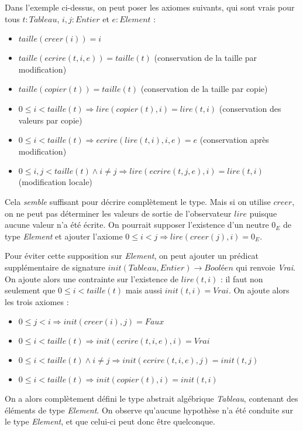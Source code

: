 \documentclass[../../../main.tex]{subfiles}
\begin{document}
Dans l'exemple ci-dessus, on peut poser les axiomes suivants, qui sont vrais pour tous $t:\textit{Tableau}$, $i, j:\textit{Entier}$ et $e:\textit{Element}$ : 
\begin{itemize}
	\item $taille(creer(i)) = i$
	\item $taille(ecrire(t, i, e)) = taille(t)$ (conservation de la taille par modification)

	\item $taille(copier(t)) = taille(t)$ (conservation de la taille par copie)
	\item $0\leq i < taille(t) \Rightarrow lire(copier(t), i) = lire(t, i)$ (conservation des valeurs par copie)
	
	\item $0\leq i < taille(t) \Rightarrow ecrire(lire(t, i), i, e) = e$ (conservation après modification)
	\item $0\leq i, j < taille(t) \wedge i \neq j \Rightarrow lire(ecrire(t, j, e), i) = lire(t, i)$ (modification locale)
\end{itemize}
Cela \textit{semble} suffisant pour décrire complètement le type. Mais si on utilise $creer$, on ne peut pas déterminer les valeurs de sortie de l'observateur $lire$ puisque aucune valeur n'a été écrite. On pourrait supposer l'existence d'un neutre $0_E$ de type \textit{Element} et ajouter l'axiome $0\leq i < j \Rightarrow lire(creer(j), i) = 0_E$.

Pour éviter cette supposition sur \textit{Element}, on peut ajouter un prédicat supplémentaire de signature $init(Tableau, Entier) \rightarrow \textit{Booléen}$ qui renvoie \textit{Vrai}. On ajoute alors une contrainte sur l'existence de $lire(t, i)$ : il faut non seulement que $0\leq i < taille(t)$ mais aussi $init(t, i) = Vrai$. On ajoute alors les trois axiomes :
\begin{itemize}
	\item $0\leq j < i \Rightarrow init(creer(i), j) = Faux$
	\item $0\leq i < taille(t) \Rightarrow init(ecrire(t, i, e), i) = Vrai$
	\item $0\leq i < taille(t) \wedge i\neq j \Rightarrow init(ecrire(t, i, e), j) = init(t, j)$
	\item $0\leq i < taille(t) \Rightarrow init(copier(t), i) = init(t, i)$
\end{itemize}
On a alors complètement défini le type abstrait algébrique \textit{Tableau}, contenant des éléments de type \textit{Element}. On observe qu'aucune hypothèse n'a été conduite sur le type \textit{Element}, et que celui-ci peut donc être quelconque.
\end{document}
